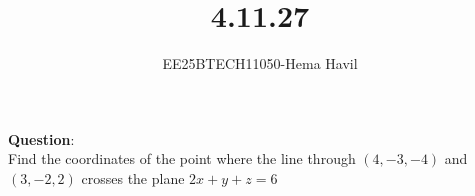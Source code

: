 \documentclass[journal]{IEEEtran}
\begin{document}

\vspace{3cm}
\title{4.11.27}
\author{EE25BTECH11050-Hema Havil}
	\maketitle
	{\let\newpage\relax\maketitle}
	
	\renewcommand{\thefigure}{\theenumi}
	\renewcommand{\thetable}{\theenumi}
	\setlength{\intextsep}{12pt} %
	
	\renewcommand{\thetable}{\theenumi}
	
	\textbf{Question}:\\
    
         Find the coordinates of the point where the line through $(4,-3,-4)$ and $(3,-2,2)$ crosses the plane $2x+y+z=6$
         
\end{document}
